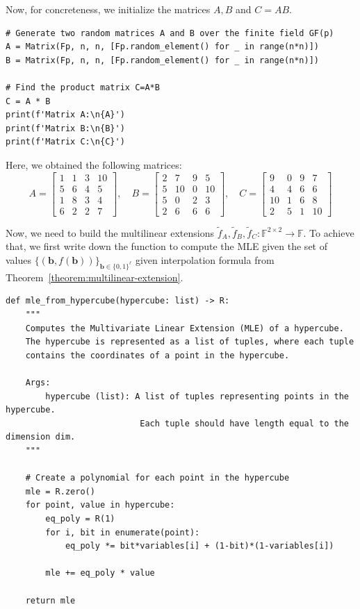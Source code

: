Now, for concreteness, we initialize the matrices $A,B$ and $C=AB$.
\begin{verbatim}
# Generate two random matrices A and B over the finite field GF(p)
A = Matrix(Fp, n, n, [Fp.random_element() for _ in range(n*n)])
B = Matrix(Fp, n, n, [Fp.random_element() for _ in range(n*n)])

# Find the product matrix C=A*B
C = A * B
print(f'Matrix A:\n{A}')
print(f'Matrix B:\n{B}')
print(f'Matrix C:\n{C}')
\end{verbatim}

Here, we obtained the following matrices:
\begin{equation*}
    A = \begin{bmatrix}
    1 & 1 & 3 & 10 \\
    5 & 6 & 4 & 5 \\
    1 & 8 & 3 & 4 \\
    6 & 2 & 2 & 7
    \end{bmatrix}, \quad B = \begin{bmatrix}
    2 & 7 & 9 & 5 \\
    5 & 10 & 0 & 10 \\
    5 & 0 & 2 & 3 \\
    2 & 6 & 6 & 6
    \end{bmatrix}, \quad C = \begin{bmatrix}
    9 & 0 & 9 & 7 \\
    4 & 4 & 6 & 6 \\
    10 & 1 & 6 & 8 \\
    2 & 5 & 1 & 10
    \end{bmatrix}
\end{equation*}

Now, we need to build the multilinear extensions $\widetilde{f}_A,
\widetilde{f}_B, \widetilde{f}_C: \mathbb{F}^{2 \times 2} \to \mathbb{F}$. To
achieve that, we first write down the function to compute the MLE given the set
of values $\{(\boldsymbol{b}, f(\boldsymbol{b}))\}_{\boldsymbol{b} \in
\{0,1\}^{\ell}}$ given interpolation formula from
Theorem~\ref{theorem:multilinear-extension}.
\begin{verbatim}
def mle_from_hypercube(hypercube: list) -> R:
    """
    Computes the Multivariate Linear Extension (MLE) of a hypercube.
    The hypercube is represented as a list of tuples, where each tuple
    contains the coordinates of a point in the hypercube.

    Args:
        hypercube (list): A list of tuples representing points in the hypercube.
                           Each tuple should have length equal to the dimension dim.
    """

    # Create a polynomial for each point in the hypercube
    mle = R.zero()
    for point, value in hypercube:
        eq_poly = R(1)
        for i, bit in enumerate(point):
            eq_poly *= bit*variables[i] + (1-bit)*(1-variables[i])

        mle += eq_poly * value
    
    return mle
\end{verbatim}

